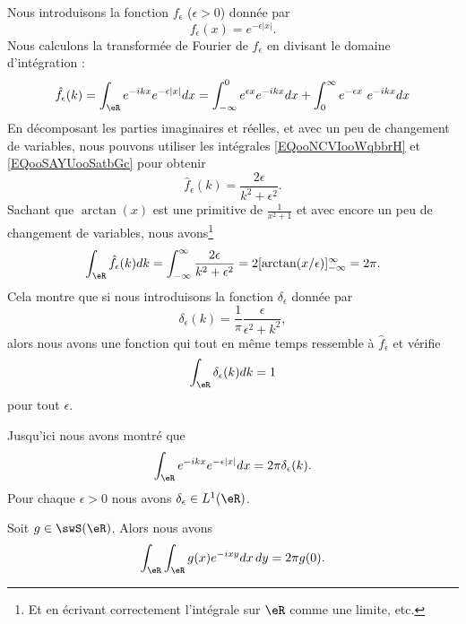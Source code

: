 \begin{example}
	Nous introduisons la fonction \( f_{\epsilon}\) (\( \epsilon>0\)) donnée par
	\begin{equation}
		f_{\epsilon}(x)= e^{-\epsilon| x |}.
	\end{equation}
	Nous calculons la transformée de Fourier de \( f_{\epsilon}\) en divisant le domaine d'intégration :
	\begin{equation}
		\hat f_{\epsilon}(k)=\int_{\eR} e^{-ikx} e^{-\epsilon| x |}dx=\int_{-\infty}^0 e^{\epsilon x} e^{-ikx}dx+\int_{0}^{\infty} e^{-\epsilon x}\ e^{-ikx}dx
	\end{equation}
	En décomposant les parties imaginaires et réelles, et avec un peu de changement de variables, nous pouvons utiliser les intégrales \eqref{EQooNCVIooWqbbrH} et \eqref{EQooSAYUooSatbGc} pour obtenir
	\begin{equation}
		\hat f_{\epsilon}(k)=\frac{ 2\epsilon }{ k^2+\epsilon^2 }.
	\end{equation}
	Sachant que \( \arctan(x)\) est une primitive de \( \frac{1}{ x^2+1 }\) et avec encore un peu de changement de variables, nous avons\footnote{Et en écrivant correctement l'intégrale sur \( \eR\) comme une limite, etc.}
	\begin{equation}
		\int_{\eR}\hat f_{\epsilon}(k)dk=\int_{-\infty}^{\infty}\frac{ 2\epsilon }{ k^2+\epsilon^2 }=2[\arctan(x/\epsilon)]_{-\infty}^{\infty}=2\pi.
	\end{equation}
	Cela montre que si nous introduisons la fonction \( \delta_{\epsilon}\) donnée par
	\begin{equation}
		\delta_{\epsilon}(k)=\frac{1}{ \pi }\frac{ \epsilon }{ \epsilon^2+k^2 },
	\end{equation}
	alors nous avons une fonction qui tout en même temps ressemble à \( \hat f_{\epsilon}\) et vérifie
	\begin{equation}
		\int_{\eR}\delta_{\epsilon}(k)dk=1
	\end{equation}
	pour tout \( \epsilon\).

	Jusqu'ici nous avons montré que
	\begin{equation}        \label{EQooQOOOooBnfJNi}
		\int_{\eR} e^{-ikx} e^{-\epsilon| x |}dx=2\pi \delta_{\epsilon}(k).
	\end{equation}
	Pour chaque \( \epsilon>0\) nous avons \( \delta_{\epsilon}\in L^1(\eR)\).
\end{example}

\begin{proposition}
	Soit \( g\in\swS(\eR)\). Alors nous avons
	\begin{equation}        \label{EQooBOJUooQGvMrk}
		\int_{\eR}\int_{\eR} g(x) e^{-ixy}dx\,dy=2\pi g(0).
	\end{equation}
\end{proposition}

